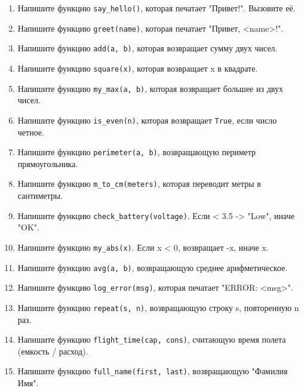 \begin{enumerate}
    \item Напишите функцию \texttt{say\_hello()}, которая печатает "Привет!". Вызовите её.
    \item Напишите функцию \texttt{greet(name)}, которая печатает "Привет, <name>!".
    \item Напишите функцию \texttt{add(a, b)}, которая возвращает сумму двух чисел.
    \item Напишите функцию \texttt{square(x)}, которая возвращает x в квадрате.
    \item Напишите функцию \texttt{my\_max(a, b)}, которая возвращает большее из двух чисел.
    \item Напишите функцию \texttt{is\_even(n)}, которая возвращает \texttt{True}, если число четное.
    \item Напишите функцию \texttt{perimeter(a, b)}, возвращающую периметр прямоугольника.
    \item Напишите функцию \texttt{m\_to\_cm(meters)}, которая переводит метры в сантиметры.
    \item Напишите функцию \texttt{check\_battery(voltage)}. Если < 3.5 -> "Low", иначе "OK".
    \item Напишите функцию \texttt{my\_abs(x)}. Если x < 0, возвращает -x, иначе x.
    \item Напишите функцию \texttt{avg(a, b)}, возвращающую среднее арифметическое.
    \item Напишите функцию \texttt{log\_error(msg)}, которая печатает "ERROR: <msg>".
    \item Напишите функцию \texttt{repeat(s, n)}, возвращающую строку s, повторенную n раз.
    \item Напишите функцию \texttt{flight\_time(cap, cons)}, считающую время полета (емкость / расход).
    \item Напишите функцию \texttt{full\_name(first, last)}, возвращающую "Фамилия Имя".
\end{enumerate}
